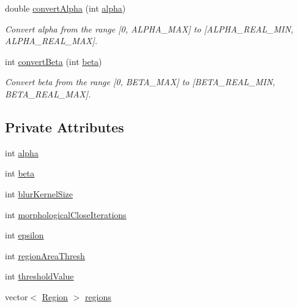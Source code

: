 \begin{DoxyCompactItemize}
double \hyperlink{classmultiscale_1_1analysis_1_1RegionDetector_a3de7a4d365c182917b74117a22075ec4}{convert\-Alpha} (int \hyperlink{classmultiscale_1_1analysis_1_1RegionDetector_ab768a3bbfff9835b441a889ab2cb05a6}{alpha})
\begin{DoxyCompactList}\small\item\em Convert alpha from the range \mbox{[}0, A\-L\-P\-H\-A\-\_\-\-M\-A\-X\mbox{]} to \mbox{[}A\-L\-P\-H\-A\-\_\-\-R\-E\-A\-L\-\_\-\-M\-I\-N, A\-L\-P\-H\-A\-\_\-\-R\-E\-A\-L\-\_\-\-M\-A\-X\mbox{]}. \end{DoxyCompactList}\item 
int \hyperlink{classmultiscale_1_1analysis_1_1RegionDetector_a60083ca10a42c25d67e371506cbf5620}{convert\-Beta} (int \hyperlink{classmultiscale_1_1analysis_1_1RegionDetector_a23c831170c2264dd7e59067a1a7d3c8e}{beta})
\begin{DoxyCompactList}\small\item\em Convert beta from the range \mbox{[}0, B\-E\-T\-A\-\_\-\-M\-A\-X\mbox{]} to \mbox{[}B\-E\-T\-A\-\_\-\-R\-E\-A\-L\-\_\-\-M\-I\-N, B\-E\-T\-A\-\_\-\-R\-E\-A\-L\-\_\-\-M\-A\-X\mbox{]}. \end{DoxyCompactList}\end{DoxyCompactItemize}
\subsection*{Private Attributes}
\begin{DoxyCompactItemize}
\item 
int \hyperlink{classmultiscale_1_1analysis_1_1RegionDetector_ab768a3bbfff9835b441a889ab2cb05a6}{alpha}
\item 
int \hyperlink{classmultiscale_1_1analysis_1_1RegionDetector_a23c831170c2264dd7e59067a1a7d3c8e}{beta}
\item 
int \hyperlink{classmultiscale_1_1analysis_1_1RegionDetector_aae6ee0ec7f0a610dd8a906c1eb181bc7}{blur\-Kernel\-Size}
\item 
int \hyperlink{classmultiscale_1_1analysis_1_1RegionDetector_a700a2f299d7c56fbd1fdbec68092f23a}{morphological\-Close\-Iterations}
\item 
int \hyperlink{classmultiscale_1_1analysis_1_1RegionDetector_acf21910fadd7c6ef2810743a78a0aeb9}{epsilon}
\item 
int \hyperlink{classmultiscale_1_1analysis_1_1RegionDetector_a1f637073a3d946d000dceed01412f19a}{region\-Area\-Thresh}
\item 
int \hyperlink{classmultiscale_1_1analysis_1_1RegionDetector_a0f7469d124c0b906d199e00ea5713007}{threshold\-Value}
\item 
vector$<$ \hyperlink{classmultiscale_1_1analysis_1_1Region}{Region} $>$ \hyperlink{classmultiscale_1_1analysis_1_1RegionDetector_aa6517ceb3a58295448d32e6e41499893}{regions}
\end{DoxyCompactItemize}

